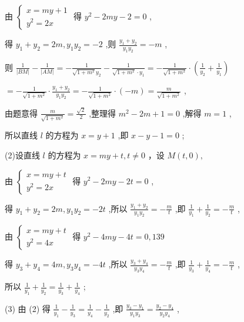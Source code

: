 \documentclass[10pt]{article}
\begin{document}
由 \(\left\{  \begin{array}{l} x = {my} + 1 \\  {y}^{2} = {2x} \end{array}\right.\) 得 \({y}^{2} - {2my} - 2 = 0\) ,

得 \({y}_{1} + {y}_{2} = {2m},{y}_{1}{y}_{2} =  - 2\) ,则 \(\frac{{y}_{1} + {y}_{2}}{{y}_{1}{y}_{2}} =  - m\) ,

则 \(\frac{1}{\left| BM\right| } - \frac{1}{\left| AM\right| } =  - \frac{1}{\sqrt{1 + {m}^{2}}{y}_{2}} - \frac{1}{\sqrt{1 + {m}^{2}} \cdot  {y}_{1}} =  - \frac{1}{\sqrt{1 + {m}^{2}}} \cdot  \left( {\frac{1}{{y}_{2}} + \frac{1}{{y}_{1}}}\right)\)

\(=  - \frac{1}{\sqrt{1 + {m}^{2}}} \cdot  \frac{{y}_{1} + {y}_{2}}{{y}_{1}{y}_{2}} =  - \frac{1}{\sqrt{1 + {m}^{2}}} \cdot  \left( {-m}\right)  = \frac{m}{\sqrt{1 + {m}^{2}}}\) ,

由题意得 \(\frac{m}{\sqrt{1 + {m}^{2}}} = \frac{\sqrt{2}}{2}\) ,整理得 \({m}^{2} - {2m} + 1 = 0\) ,解得 \(m = 1\) ,

所以直线 \(l\) 的方程为 \(x = y + 1\) ,即 \(x - y - 1 = 0\) ;

(2)设直线 \(l\) 的方程为 \(x = {my} + t,t \neq  0\) ，设 \(M\left( {t,0}\right) ,\)

由 \(\left\{  \begin{array}{l} x = {my} + t \\  {y}^{2} = {2x} \end{array}\right.\) 得 \({y}^{2} - {2my} - {2t} = 0\) ,

得 \({y}_{1} + {y}_{2} = {2m},{y}_{1}{y}_{2} =  - {2t}\) ,所以 \(\frac{{y}_{1} + {y}_{2}}{{y}_{1}{y}_{2}} =  - \frac{m}{t}\) ,即 \(\frac{1}{{y}_{1}} + \frac{1}{{y}_{2}} =  - \frac{m}{t}\) ,

由 \(\left\{  \begin{array}{l} x = {my} + t \\  {y}^{2} = {4x} \end{array}\right.\) 得 \({y}^{2} - {4my} - {4t} = 0,{139}\)

得 \({y}_{3} + {y}_{4} = {4m},{y}_{3}{y}_{4} =  - {4t}\) ,所以 \(\frac{{y}_{3} + {y}_{4}}{{y}_{3}{y}_{4}} =  - \frac{m}{t}\) ,即 \(\frac{1}{{y}_{3}} + \frac{1}{{y}_{4}} =  - \frac{m}{t}\) ,

所以 \(\frac{1}{{y}_{1}} + \frac{1}{{y}_{2}} = \frac{1}{{y}_{3}} + \frac{1}{{y}_{4}}\) ;

(3) 由 (2) 得 \(\frac{1}{{y}_{1}} - \frac{1}{{y}_{3}} = \frac{1}{{y}_{4}} - \frac{1}{{y}_{2}}\) ,即 \(\frac{{y}_{3} - {y}_{1}}{{y}_{1}{y}_{3}} = \frac{{y}_{2} - {y}_{4}}{{y}_{2}{y}_{4}}\) ,
\end{document}

